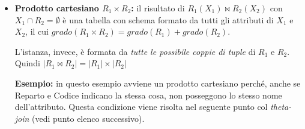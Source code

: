 \documentclass{article}
\newcounter{esempio}
\begin{document}
\begin{itemize}
{{Un join naturale su relazioni che non hanno attributi in comune è un \textbf{prodotto cartesiano}. Il risultato contiene sempre un numero di tuple pari al prodotto della cardinalità dei due. $|R_1 \bowtie R_2| = |R_1| \times |R_2|$

}
}


\item \textbf{Prodotto cartesiano $R_1\times R_2$:} il risultato di $R_1(X_1) \bowtie R_2(X_2)$ con $X_1 \cap R_2 = \emptyset$ è una tabella con schema formato da tutti gli attributi di $X_1$ e $X_2$, il cui $grado (R_1 \times R_2) = grado(R_1) + grado(R_2)$. 

L'istanza, invece, è formata da \textit{tutte le possibile coppie di tuple} di $R_1$ e $R_2$. Quindi 
$|R_1 \bowtie R_2| = |R_1| \times |R_2|$

\newpage
\textbf{Esempio:} in questo esempio avviene un prodotto cartesiano perché, anche se Reparto e Codice indicano la stessa cosa, non posseggono lo stesso nome dell'attributo. Questa condizione viene risolta nel seguente punto col \textit{theta-join} (vedi punto elenco successivo).


\end{itemize}
\end{document}
